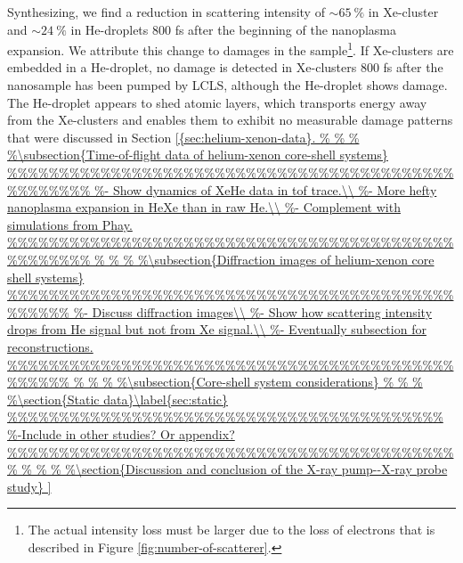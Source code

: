 %
Synthesizing, we find a reduction in scattering intensity of $\sim \SI{65}{\percent}$ in Xe-cluster and $\sim \SI{24}{\percent}$ in He-droplets 800 fs after the beginning of the nanoplasma expansion. We attribute this change to damages in the sample\footnote{The actual intensity loss must be larger due to the loss of electrons that is described in Figure \ref{fig:number-of-scatterer}.}. If Xe-clusters are embedded in a He-droplet, no damage is detected in Xe-clusters 800 fs after the nanosample has been pumped by LCLS, although the He-droplet shows damage. The He-droplet appears to shed atomic layers, which transports energy away from the Xe-clusters and enables them to exhibit no measurable damage patterns that were discussed in Section \ref{{sec:helium-xenon-data}.
%
%
%
%
%
%
%
%
%
%
%
%
%
%
%
}
